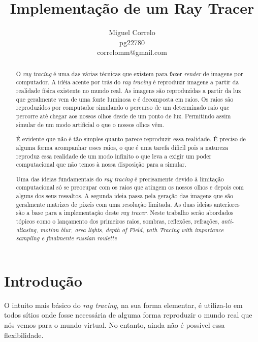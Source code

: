 \documentclass[12pt]{article}
\title{Implementação de um Ray Tracer}
\author{Miguel Correlo \\
\small{pg22780}\\
\small{correlomm@gmail.com}}
\begin{document}
\maketitle

\newpage
\begin{abstract}
O {\it ray tracing} é uma das várias técnicas que existem para fazer {\it render} de imagens por computador. A idéia acente por trás do {\it ray tracing} é reproduzir imagens a partir da realidade física existente no mundo real. As imagens são reproduzidas a partir da luz que geralmente vem de uma fonte luminosa e é decomposta em raios. Os raios são reproduzidos por computador simulando o percurso de um determinado raio que percorre até chegar aos nossos olhos desde de um ponto de luz. Permitindo assim simular de um modo artificial o que o nossos olhos vêm.\newline

É evidente que não é tão simples quanto parece reproduzir essa realidade. É preciso de alguma forma acompanhar esses raios, o que é uma tarefa díficil pois a natureza reproduz essa realidade de um modo infinito o que leva a exigir um poder computacional que não temos à nossa disposição para a simular.\newline

Uma das ideias fundamentais do {\it ray tracing} é precisamente devido à limitação computacional só se preocupar com os raios que atingem os nossos olhos e depois com alguns dos seus ressaltos. A segunda ideia passa pela geração das imagens que são geralmente matrizes de pixeis com uma resolução limitada. As duas ideias anteriores são a base para a implementação deste {\it ray tracer}. Neste trabalho serão abordados tópicos como o lançamento dos primeiros raios, sombras, reflexões, refrações, {\it anti-aliasing, motion blur, area lights, depth of Field, path Tracing with importance sampling e finalmente russian roulette}


\end{abstract}
\newpage
\tableofcontents
\newpage
\section{Introdução}
\vspace{5 mm}
\hspace{8 mm} O intuito mais básico do {\it ray tracing}, na sua forma elementar, é utiliza-lo em todos sítios onde fosse necessária de alguma forma reproduzir o mundo real que nós vemos para o mundo virtual. No entanto, ainda não é possível essa flexibilidade.\newline
\end{document}
